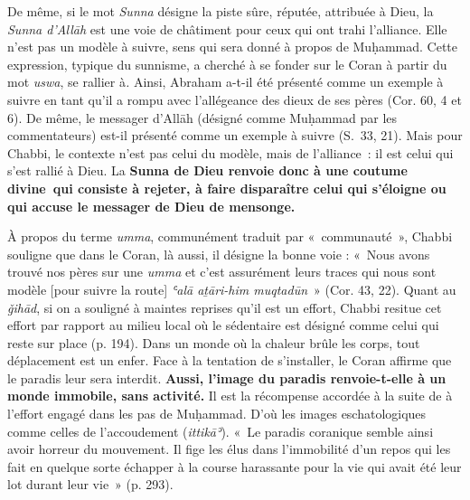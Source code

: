 
De même, si le mot \emph{Sunna} désigne la piste sûre, réputée,
attribuée à Dieu, la \emph{Sunna d'Allāh} est une voie de châtiment pour
ceux qui ont trahi l'alliance. Elle n'est pas un modèle à suivre, sens
qui sera donné à propos de Muḥammad. Cette expression, typique du
sunnisme, a cherché à se fonder sur le Coran à partir du mot
\emph{uswa}, se rallier à\emph{.} Ainsi, Abraham a-t-il été présenté
comme un exemple à suivre en tant qu'il a rompu avec l'allégeance des
dieux de ses pères (Cor. 60, 4 et 6). De même, le messager d'Allāh
(désigné comme Muḥammad par les commentateurs) est-il présenté comme un
exemple à suivre (S.~33, 21). Mais pour Chabbi, le contexte n'est pas
celui du modèle, mais de l'alliance~: il est celui qui s'est rallié à
Dieu. La \textbf{Sunna de Dieu renvoie donc à une coutume divine~qui
consiste à rejeter, à faire disparaître celui qui s'éloigne ou qui
accuse le messager de Dieu de mensonge.}

À propos du terme \emph{umma}, communément traduit par «~communauté~»,
Chabbi souligne que dans le Coran, là aussi, il désigne la bonne voie :
«~Nous avons trouvé nos pères sur une \emph{umma} et c'est assurément
leurs traces qui nous sont modèle {[}pour suivre la route{]} \emph{ʿalā
aṯāri-him muqtadūn}~» (Cor. 43, 22). Quant au \emph{ǧihād}, si on a
souligné à maintes reprises qu'il est un effort, Chabbi resitue cet
effort par rapport au milieu local où le sédentaire est désigné comme
celui qui reste sur place (p. 194). Dans un monde où la chaleur brûle
les corps, tout déplacement est un enfer. Face à la tentation de
s'installer, le Coran affirme que le paradis leur sera interdit.
\textbf{Aussi, l'image du paradis renvoie-t-elle à un monde immobile,
sans activité.} Il est la récompense accordée à la suite de à l'effort
engagé dans les pas de Muḥammad. D'où les images eschatologiques comme
celles de l'accoudement (\emph{ittikāʾ}). «~Le paradis coranique semble
ainsi avoir horreur du mouvement. Il fige les élus dans l'immobilité
d'un repos qui les fait en quelque sorte échapper à la course harassante
pour la vie qui avait été leur lot durant leur vie~» (p. 293).


